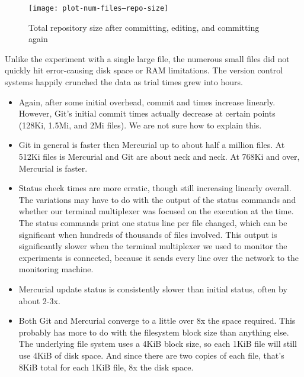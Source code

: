 \begin{figure}[p]
  \caption{Total repository size after committing, editing, and committing again}
  \label{fig:plot-num-files--repo-size}
  \centering
    \texttt{[image: plot-num-files--repo-size]}
\end{figure}



Unlike the experiment with a single large file, the numerous small files did not
quickly hit error-causing disk space or RAM limitations. The version control
systems happily crunched the data as trial times grew into hours.

\begin{itemize}

    \item Again, after some initial overhead, commit and times increase
        linearly. However, Git's initial commit times actually decrease at
        certain points (128Ki, 1.5Mi, and 2Mi files). We are not sure how to
        explain this.

    \item Git in general is faster then Mercurial up to about half a million
        files. At 512Ki files is Mercurial and Git are about neck and neck. At
        768Ki and over, Mercurial is faster.

    \item Status check times are more erratic, though still increasing linearly
        overall. The variations may have to do with the output of the status
        commands and whether our terminal multiplexer was focused on the
        execution at the time. The status commands print one status line per
        file changed, which can be significant when hundreds of thousands of
        files involved. This output is significantly slower when the terminal
        multiplexer we used to monitor the experiments is connected, because it
        sends every line over the network to the monitoring machine.

    \item Mercurial update status is consistently slower than initial status,
        often by about 2-3x.

    \item Both Git and Mercurial converge to a little over 8x the space
        required. This probably has more to do with the filesystem block size
        than anything else. The underlying file system uses a 4KiB block size,
        so each 1KiB file will still use 4KiB of disk space. And since there are
        two copies of each file, that's 8KiB total for each 1KiB file, 8x the
        disk space.


\end{itemize}

